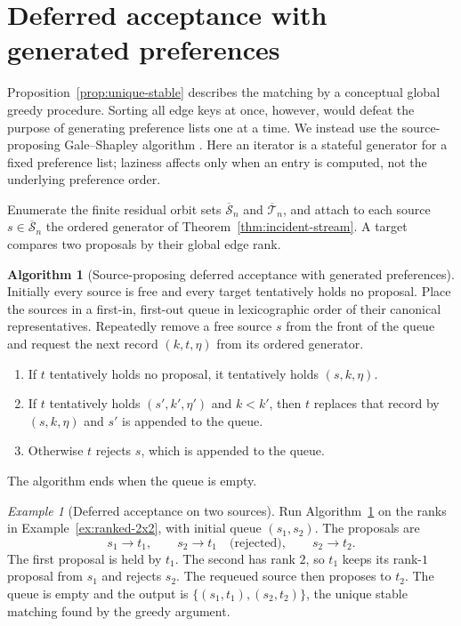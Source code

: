 \documentclass[11pt]{amsart}
\theoremstyle{definition}
\newtheorem{algorithm}[theorem]{Algorithm}
\theoremstyle{remark}
\newtheorem{example}[theorem]{Example}
\newcommand{\Sbar}{\overline{\mathcal S}_n}
\newcommand{\Tbar}{\overline{\mathcal T}_n}
\begin{document}
\section{Deferred acceptance with generated preferences}
\label{sec:deferred-acceptance}

Proposition~\ref{prop:unique-stable} describes the matching by a conceptual
global greedy procedure.  Sorting all edge keys at once, however, would defeat
the purpose of generating preference lists one at a time.  We instead use the
source-proposing Gale--Shapley algorithm \cite{GaleShapley}.  Here an iterator
is a stateful generator for a fixed preference list; laziness affects only
when an entry is computed, not the underlying preference order.

Enumerate the finite residual orbit sets $\Sbar$ and $\Tbar$, and attach to
each source $s\in\Sbar$ the ordered generator of
Theorem~\ref{thm:incident-stream}.  A target compares two proposals by their
global edge rank.

\begin{algorithm}[Source-proposing deferred acceptance with generated
preferences]\label{alg:lazy-da}
Initially every source is free and every target tentatively holds no proposal.
Place the
sources in a first-in, first-out queue in lexicographic order of their
canonical representatives.  Repeatedly remove a free source $s$ from the
front of the queue and request the next record $(k,t,\eta)$ from its ordered
generator.
\begin{enumerate}
\item If $t$ tentatively holds no proposal, it tentatively holds
$(s,k,\eta)$.
\item If $t$ tentatively holds $(s',k',\eta')$ and $k<k'$, then $t$ replaces
that record by $(s,k,\eta)$ and $s'$ is appended to the queue.
\item Otherwise $t$ rejects $s$, which is appended to the queue.
\end{enumerate}
The algorithm ends when the queue is empty.
\end{algorithm}

\begin{example}[Deferred acceptance on two sources]
\label{ex:DA-2x2}
Run Algorithm~\ref{alg:lazy-da} on the ranks in
Example~\ref{ex:ranked-2x2}, with initial queue $(s_1,s_2)$.  The proposals
are
\[
 s_1\longrightarrow t_1,
 \qquad
 s_2\longrightarrow t_1\quad\text{(rejected)},
 \qquad
 s_2\longrightarrow t_2.
\]
The first proposal is held by $t_1$.  The second has rank $2$, so $t_1$ keeps
its rank-$1$ proposal from $s_1$ and rejects $s_2$.  The requeued source then
proposes to $t_2$.  The queue is empty and the output is
$\{(s_1,t_1),(s_2,t_2)\}$, the unique stable matching found by the greedy
argument.
\end{example}
\end{document}

